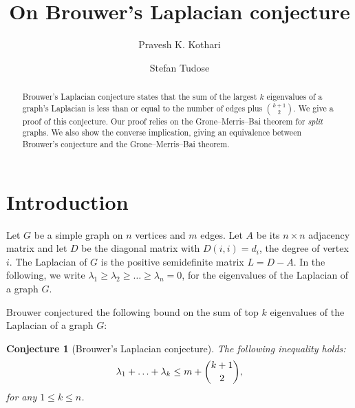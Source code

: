 \documentclass[10pt,reqno]{amsart}
\newtheorem{conjecture}{Conjecture}
\theoremstyle{definition}
\theoremstyle{remark}
\numberwithin{equation}{section}
\begin{document}
\title[On Brouwer's Laplacian conjecture]{On Brouwer's Laplacian conjecture}

\author[Kothari]{Pravesh K. Kothari}
\author[Tudose]{Stefan Tudose}


\address{Department of Computer Science, Princeton University, Princeton, NJ 08544, USA}

\address{Department of Mathematics, Princeton University, Princeton, NJ 08544, USA}

\begin{abstract}
Brouwer's Laplacian conjecture states that the sum of the largest $k$ eigenvalues of a graph's Laplacian is less than or equal to the number of edges plus $\binom{k+1}{2}$. We give a proof of this conjecture. Our proof relies on the Grone--Merris--Bai theorem for \emph{split} graphs. We also show the converse implication, giving an equivalence between Brouwer's conjecture and the Grone--Merris--Bai theorem. %
\end{abstract}


\maketitle



\section{Introduction}
\label{sec:intro}
Let $G$ be a simple graph on $n$ vertices and $m$ edges. Let $A$ be its $n \times n$ adjacency matrix and let $D$ be the diagonal matrix with $D(i,i) = d_i$, the degree of vertex $i$. The Laplacian of $G$ is the positive semidefinite matrix $L = D-A$. In the following, we write $\lambda_1\ge \lambda_2\ge \ldots\ge \lambda_n=0$, for the eigenvalues of the Laplacian of a graph $G$. 

Brouwer conjectured \cite{BrouwerHaemers2012,HaemersMohammadianTayfehRezaie2010} the following bound on the sum of top $k$ eigenvalues of the Laplacian of a graph $G$:
\begin{conjecture}[Brouwer's Laplacian conjecture] \label{conj:brouwer}
    The following inequality holds:
    $$\lambda_1+\ldots+\lambda_k\le m+\dbinom{k+1}{2},$$
    for any $1\le k\le n$. 
\end{conjecture}
\end{document}
